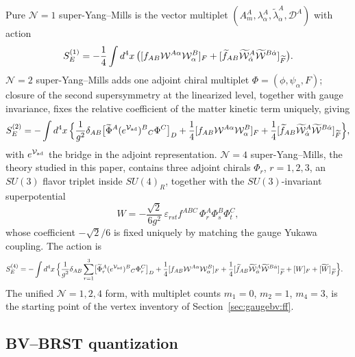 Pure $\mathcal N=1$ super-Yang--Mills is the vector multiplet $(A_m^A,\lambda_\alpha^A,\widetilde\lambda_{\dot\alpha}^A,\mathscr D^A)$ with action
\begin{equation}\label{eq:gaugebv:SEN1}
S_E^{(1)}=-\frac14\int d^4x\,\bigl(
[f_{AB}\mathcal{W}^{A\alpha}\mathcal{W}^B_\alpha]_F
+[\widetilde f_{AB}\widetilde{\mathcal{W}}^A_{\dot\alpha}\widetilde{\mathcal{W}}^{B\dot\alpha}]_{\widetilde F}\bigr).
\end{equation}
$\mathcal N=2$ super-Yang--Mills adds one adjoint chiral multiplet $\Phi=(\phi,\psi_\alpha,F)$; closure of the second supersymmetry at the linearized level, together with gauge invariance, fixes the relative coefficient of the matter kinetic term uniquely, giving
\begin{equation}\label{eq:gaugebv:SEN2}
S_E^{(2)}=-\int d^4x\,\Big\{
\frac1{g^2}\delta_{AB}\bigl[\widetilde\Phi^A(e^{\mathcal{V}_{\rm ad}})^B{}_C\Phi^C\bigr]_D
+\frac14[f_{AB}\mathcal{W}^{A\alpha}\mathcal{W}^B_\alpha]_F
+\frac14[\widetilde f_{AB}\widetilde{\mathcal{W}}^A_{\dot\alpha}\widetilde{\mathcal{W}}^{B\dot\alpha}]_{\widetilde F}\Big\},
\end{equation}
with $e^{\mathcal{V}_{\rm ad}}$ the bridge in the adjoint representation. $\mathcal N=4$ super-Yang--Mills, the theory studied in this paper, contains three adjoint chirals $\Phi_r$, $r=1,2,3$, an $SU(3)$ flavor triplet inside $SU(4)_R$, together with the $SU(3)$-invariant superpotential
\begin{equation}\label{eq:gaugebv:WN4}
W=-\frac{\sqrt2}{6g^2}\,\varepsilon_{rst}f^{ABC}\,\Phi_r^A\Phi_s^B\Phi_t^C,
\end{equation}
whose coefficient $-\sqrt2/6$ is fixed uniquely by matching the gauge Yukawa coupling. The action is
\begin{equation}\label{eq:gaugebv:SEN4}
\begin{aligned}
S_E^{(4)}=-\int d^4x\,\Big\{&
\frac1{g^2}\delta_{AB}\sum_{r=1}^3\bigl[\widetilde\Phi_r^A(e^{\mathcal{V}_{\rm ad}})^B{}_C\Phi_r^C\bigr]_D
+\frac14[f_{AB}\mathcal{W}^{A\alpha}\mathcal{W}^B_\alpha]_F
+\frac14[\widetilde f_{AB}\widetilde{\mathcal{W}}^A_{\dot\alpha}\widetilde{\mathcal{W}}^{B\dot\alpha}]_{\widetilde F}
+[W]_F+[\widetilde W]_{\widetilde F}\Big\}.
\end{aligned}
\end{equation}
The unified $\mathcal N=1,2,4$ form, with multiplet counts $m_1=0$, $m_2=1$, $m_4=3$, is the starting point of the vertex inventory of Section~\ref{sec:gaugebv:ff}.

\subsection{BV--BRST quantization}\label{sec:gaugebv:bv}

